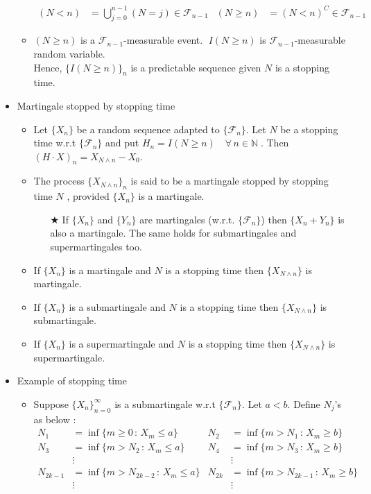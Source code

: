 \documentclass[12pt, A4]{article}
\newcommand{\trick}{$\bigstar$}
\newcommand{\N}{\mathbb{N}}
\newcommand{\F}{\mathcal{F}}
\newcommand{\foranyn}{\quad \forall \, n\in \N}
\begin{document}
\begin{itemize}
\begin{itemize}
\begin{align*}
			(N<n)&=\bigcup_{j=0}^{n-1} (N=j) \in \F_{n-1}	& (N\geq n)&=(N<n)^C\in \F_{n-1}
		\end{align*}
		\item $(N\geq n)$ is a $\F_{n-1}$-measurable event. $\;I(N\geq n)$ is $\F_{n-1}$-measurable random variable. \\ Hence, $\{I(N\geq n)\}_n$ is a predictable sequence given $N$ is a stopping time.
	\end{itemize} 
	\item Martingale stopped by stopping time
	\begin{itemize}
		\item Let $\{X_n\}$ be a random sequence adapted to $\{\F_n\}$. Let $N$ be a stopping time w.r.t $\{\F_n\}$ and put $H_n=I(N\geq n)\foranyn\;$. Then $(H\cdot X)_n=X_{N\wedge n}-X_0$. 
		\item The process $\{X_{N\wedge n}\}_n$ is said to be a martingale stopped by stopping time $N$ , provided $\{X_n\}$ is a martingale.
		\begin{itemize}
			\item[\trick] If $\{X_n\}$ and $\{Y_n\}$ are martingales (w.r.t. $\{\F_n\}$) then $\{X_n+Y_n\}$ is also a martingale. The same holds for submartingales and supermartingales too.
		\end{itemize}
		\item If $\{X_n\}$ is a martingale and $N$ is a stopping time then $\{X_{N\wedge n}\}$ is martingale.
		\item If $\{X_n\}$ is a submartingale and $N$ is a stopping time then $\{X_{N\wedge n}\}$ is submartingale.
		\item If $\{X_n\}$ is a supermartingale and $N$ is a stopping time then $\{X_{N\wedge n}\}$ is supermartingale.
	\end{itemize} 
	\item Example of stopping time
	\begin{itemize}
		\item Suppose $\{X_n\}_{n=0}^\infty$ is a submartingale w.r.t $\{\F_n\}$. Let $a<b$. Define $N_j$'s as below :
		\begin{align*}
			N_1 &= \inf\{m\geq 0\, :\, X_m\leq a\}  &  N_2&=\inf\{m>N_1\, :\, X_m\geq b \} \\ N_3 &= \inf\{m>N_2\, :\, X_m\leq a\}  &  N_4&=\inf\{m>N_3\, :\, X_m\geq b \} \\ &\vdots	&	&\vdots \\ N_{2k-1}&=\inf\{m>N_{2k-2}\, :\, X_m\leq a\}	& N_{2k}&=\inf\{m>N_{2k-1}\,:\, X_m\geq b\} \\ &\vdots	&	&\vdots

\end{align*}
\end{itemize}
\end{itemize}
\end{document}
